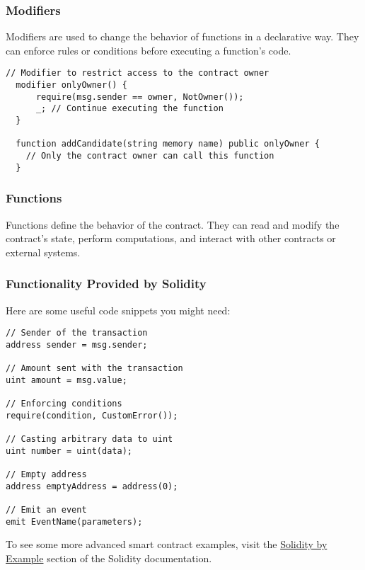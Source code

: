 \documentclass[12pt]{article}
\begin{document}
\subsubsection*{Modifiers}

Modifiers are used to change the behavior of functions in a declarative way. They can enforce rules or conditions before executing a function's code.

\begin{lstlisting}[language=Solidity]
  // Modifier to restrict access to the contract owner
  modifier onlyOwner() {
      require(msg.sender == owner, NotOwner());
      _; // Continue executing the function
  }

  function addCandidate(string memory name) public onlyOwner {
    // Only the contract owner can call this function
  }
\end{lstlisting}

\subsubsection*{Functions}

Functions define the behavior of the contract. They can read and modify the contract's state, perform computations, and interact with other contracts or external systems.

\subsubsection*{Functionality Provided by Solidity}
Here are some useful code snippets you might need:

\begin{lstlisting}[language=Solidity]
// Sender of the transaction
address sender = msg.sender;

// Amount sent with the transaction
uint amount = msg.value;

// Enforcing conditions
require(condition, CustomError());

// Casting arbitrary data to uint
uint number = uint(data);

// Empty address
address emptyAddress = address(0);

// Emit an event
emit EventName(parameters);
\end{lstlisting}

\noindent
To see some more advanced smart contract examples, visit the \href{https://docs.soliditylang.org/en/latest/solidity-by-example.html}{Solidity by Example} section of the Solidity documentation.
\end{document}
